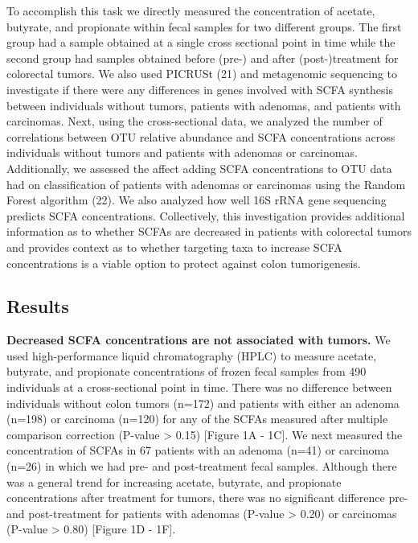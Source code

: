 \documentclass[11pt,]{article}
\begin{document}
To accomplish this task we directly measured the concentration of
acetate, butyrate, and propionate within fecal samples for two different
groups. The first group had a sample obtained at a single cross
sectional point in time while the second group had samples obtained
before (pre-) and after (post-)treatment for colorectal tumors. We also
used PICRUSt (21) and metagenomic sequencing to investigate if there
were any differences in genes involved with SCFA synthesis between
individuals without tumors, patients with adenomas, and patients with
carcinomas. Next, using the cross-sectional data, we analyzed the number
of correlations between OTU relative abundance and SCFA concentrations
across individuals without tumors and patients with adenomas or
carcinomas. Additionally, we assessed the affect adding SCFA
concentrations to OTU data had on classification of patients with
adenomas or carcinomas using the Random Forest algorithm (22). We also
analyzed how well 16S rRNA gene sequencing predicts SCFA concentrations.
Collectively, this investigation provides additional information as to
whether SCFAs are decreased in patients with colorectal tumors and
provides context as to whether targeting taxa to increase SCFA
concentrations is a viable option to protect against colon
tumorigenesis.

\newpage

\subsection{Results}\label{results}

\textbf{Decreased SCFA concentrations are not associated with tumors.}
We used high-performance liquid chromatography (HPLC) to measure
acetate, butyrate, and propionate concentrations of frozen fecal samples
from 490 individuals at a cross-sectional point in time. There was no
difference between individuals without colon tumors (n=172) and patients
with either an adenoma (n=198) or carcinoma (n=120) for any of the SCFAs
measured after multiple comparison correction (P-value \textgreater{}
0.15) {[}Figure 1A - 1C{]}. We next measured the concentration of SCFAs
in 67 patients with an adenoma (n=41) or carcinoma (n=26) in which we
had pre- and post-treatment fecal samples. Although there was a general
trend for increasing acetate, butyrate, and propionate concentrations
after treatment for tumors, there was no significant difference pre- and
post-treatment for patients with adenomas (P-value \textgreater{} 0.20)
or carcinomas (P-value \textgreater{} 0.80) {[}Figure 1D - 1F{]}.
\end{document}
